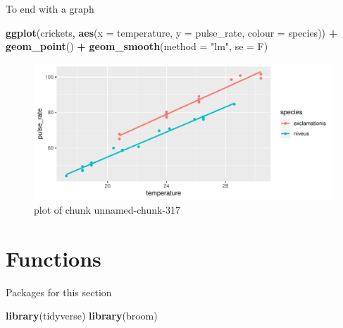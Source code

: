 \documentclass[ignorenonframetext,]{beamer}
\newenvironment{Shaded}{\begin{snugshade}}{\end{snugshade}}
\newcommand{\DataTypeTok}[1]{\textcolor[rgb]{0.13,0.29,0.53}{#1}}
\newcommand{\KeywordTok}[1]{\textcolor[rgb]{0.13,0.29,0.53}{\textbf{#1}}}
\newcommand{\NormalTok}[1]{#1}
\newcommand{\OperatorTok}[1]{\textcolor[rgb]{0.81,0.36,0.00}{\textbf{#1}}}
\newcommand{\StringTok}[1]{\textcolor[rgb]{0.31,0.60,0.02}{#1}}
\begin{document}
\begin{frame}[fragile]{To end with a graph}
\protect\hypertarget{to-end-with-a-graph}{}

\begin{Shaded}
\begin{Highlighting}[]
\KeywordTok{ggplot}\NormalTok{(crickets, }\KeywordTok{aes}\NormalTok{(}\DataTypeTok{x =}\NormalTok{ temperature, }\DataTypeTok{y =}\NormalTok{ pulse_rate,}
  \DataTypeTok{colour =}\NormalTok{ species)) }\OperatorTok{+}
\StringTok{  }\KeywordTok{geom_point}\NormalTok{() }\OperatorTok{+}\StringTok{ }\KeywordTok{geom_smooth}\NormalTok{(}\DataTypeTok{method =} \StringTok{"lm"}\NormalTok{, }\DataTypeTok{se =}\NormalTok{ F)}
\end{Highlighting}
\end{Shaded}

\begin{figure}
\centering
\includegraphics{figure/unnamed-chunk-317-1.pdf}
\caption{plot of chunk unnamed-chunk-317}
\end{figure}

\end{frame}

\hypertarget{functions}{%
\section{Functions}\label{functions}}

\begin{frame}[fragile]{Packages for this section}
\protect\hypertarget{packages-for-this-section-8}{}

\begin{Shaded}
\begin{Highlighting}[]
\KeywordTok{library}\NormalTok{(tidyverse)}
\KeywordTok{library}\NormalTok{(broom)}
\end{Highlighting}
\end{Shaded}

\end{frame}
\end{document}
